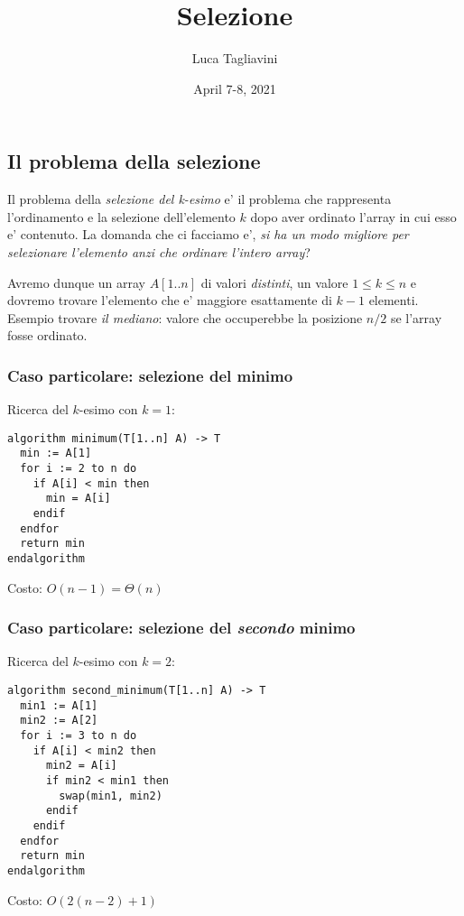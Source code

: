 \documentclass{article}
\title{\textbf{Selezione}}
\author{Luca Tagliavini}
\date{April 7-8, 2021}
\begin{document}
\maketitle
\tableofcontents
\pagebreak

\subsection{Il problema della selezione}

Il problema della \emph{selezione del k-esimo} e' il problema che rappresenta
l'ordinamento e la selezione dell'elemento $k$ dopo aver ordinato l'array in cui
esso e' contenuto. La domanda che ci facciamo e', \emph{si ha un modo migliore per
selezionare l'elemento anzi che ordinare l'intero array}?

Avremo dunque un array $A[1..n]$ di valori \emph{distinti}, un valore $1 \leq
k \leq n$ e dovremo trovare l'elemento che e' maggiore esattamente di $k-1$
elementi. Esempio trovare \emph{il mediano}: valore che occuperebbe la posizione
$n/2$ se l'array fosse ordinato.

\subsubsection{Caso particolare: selezione del minimo}

Ricerca del $k$-esimo con $k = 1$:

\begin{lstlisting}
algorithm minimum(T[1..n] A) -> T
  min := A[1]
  for i := 2 to n do
    if A[i] < min then
      min = A[i]
    endif
  endfor
  return min
endalgorithm
\end{lstlisting}

Costo: $O(n-1) = \Theta(n)$

\subsubsection{Caso particolare: selezione del \emph{secondo} minimo}

Ricerca del $k$-esimo con $k = 2$:

\begin{lstlisting}
algorithm second_minimum(T[1..n] A) -> T
  min1 := A[1]
  min2 := A[2]
  for i := 3 to n do
    if A[i] < min2 then
      min2 = A[i]
      if min2 < min1 then
        swap(min1, min2)
      endif
    endif
  endfor
  return min
endalgorithm
\end{lstlisting}

Costo: $O(2(n-2)+1)$
\end{document}
